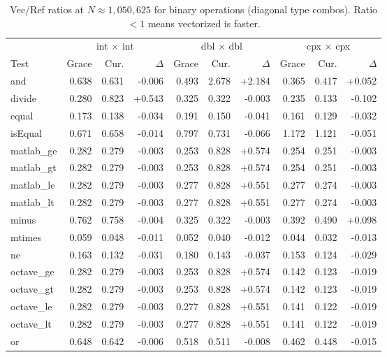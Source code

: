 \begin{table}[H]
\centering
\caption{Vec/Ref ratios at $N \approx 1{,}050{,}625$ for binary operations (diagonal type combos). Ratio $< 1$ means vectorized is faster.}
\label{tab:ratio-binary-diag}
\small
\begin{tabular}{l | r r r | r r r | r r r}
\toprule
 & \multicolumn{3}{c|}{int $\times$ int} & \multicolumn{3}{c|}{dbl $\times$ dbl} & \multicolumn{3}{c}{cpx $\times$ cpx} \\
Test & Grace & Cur. & $\Delta$ & Grace & Cur. & $\Delta$ & Grace & Cur. & $\Delta$ \\
\midrule
  and & 0.638 & 0.631 & -0.006 & 0.493 & 2.678 & +2.184 & 0.365 & 0.417 & +0.052 \\
  divide & 0.280 & 0.823 & +0.543 & 0.325 & 0.322 & -0.003 & 0.235 & 0.133 & -0.102 \\
  equal & 0.173 & 0.138 & -0.034 & 0.191 & 0.150 & -0.041 & 0.161 & 0.129 & -0.032 \\
  isEqual & 0.671 & 0.658 & -0.014 & 0.797 & 0.731 & -0.066 & 1.172 & 1.121 & -0.051 \\
  matlab\_ge & 0.282 & 0.279 & -0.003 & 0.253 & 0.828 & +0.574 & 0.254 & 0.251 & -0.003 \\
  matlab\_gt & 0.282 & 0.279 & -0.003 & 0.253 & 0.828 & +0.574 & 0.254 & 0.251 & -0.003 \\
  matlab\_le & 0.282 & 0.279 & -0.003 & 0.277 & 0.828 & +0.551 & 0.277 & 0.274 & -0.003 \\
  matlab\_lt & 0.282 & 0.279 & -0.003 & 0.277 & 0.828 & +0.551 & 0.277 & 0.274 & -0.003 \\
  minus & 0.762 & 0.758 & -0.004 & 0.325 & 0.322 & -0.003 & 0.392 & 0.490 & +0.098 \\
  mtimes & 0.059 & 0.048 & -0.011 & 0.052 & 0.040 & -0.012 & 0.044 & 0.032 & -0.013 \\
  ne & 0.163 & 0.132 & -0.031 & 0.180 & 0.143 & -0.037 & 0.153 & 0.124 & -0.029 \\
  octave\_ge & 0.282 & 0.279 & -0.003 & 0.253 & 0.828 & +0.574 & 0.142 & 0.123 & -0.019 \\
  octave\_gt & 0.282 & 0.279 & -0.003 & 0.253 & 0.828 & +0.574 & 0.142 & 0.123 & -0.019 \\
  octave\_le & 0.282 & 0.279 & -0.003 & 0.277 & 0.828 & +0.551 & 0.141 & 0.122 & -0.019 \\
  octave\_lt & 0.282 & 0.279 & -0.003 & 0.277 & 0.828 & +0.551 & 0.141 & 0.122 & -0.019 \\
  or & 0.648 & 0.642 & -0.006 & 0.518 & 0.511 & -0.008 & 0.462 & 0.448 & -0.015 \\

\end{tabular}
\end{table}
